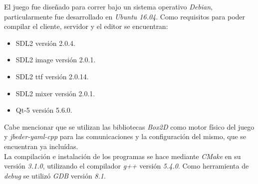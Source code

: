El juego fue diseñado para correr bajo un sistema operativo \textit{Debian}, particularmente fue desarrollado en \emph{Ubuntu 16.04}. Como requisitos para poder compilar el cliente, servidor y el editor se encuentran:

\begin{itemize}
	\item SDL2 versión 2.0.4.
	\item SDL2 image versión 2.0.1.
	\item SDL2 ttf versión 2.0.14.
	\item SDL2 mixer versión 2.0.1.
	\item Qt-5 versión 5.6.0.
\end{itemize}

Cabe mencionar que se utilizan las bibliotecas \emph{Box2D} como motor físico del juego y \emph{jbeder-yaml-cpp} para las comunicaciones y la configuración del mismo, que se encuentran ya incluídas.\\
\indent La compilación e instalación de los programas se hace mediante \textit{CMake} en su versión \textit{3.1.0}, utilizando el compilador \textit{g++} versión \textit{5.4.0}. Como herramienta de \textit{debug} se utilizó \textit{GDB} versión \textit{8.1}.


